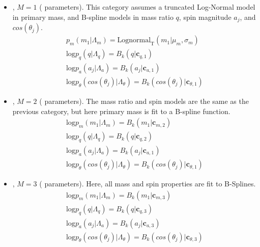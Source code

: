 \begin{itemize}
    \item \first{}, $M=1$ ( parameters). This category assumes a truncated Log-Normal model in primary mass, and B-spline models in mass ratio $q$, spin magnitude $a_j$, and $cos(\theta_{j})$. 
    \begin{eqnarray} \label{eq:lowmass}
        p_{m}(m_1| \Lambda_{m}) = \text{Lognormal}_\text{T}(m_1 | \mu_{m}, \sigma_{m}) \\
        \text{log} p_{q}(q| \Lambda_{q}) = B_k(q | \mathbf{c}_{q,1}) \\
        \text{log} p_{a}(a_j| \Lambda_{a}) = B_k(a_j | \mathbf{c}_{a,1}) \\
        \text{log} p_{\theta}(cos(\theta_j)| \Lambda_{\theta}) = B_k( cos(\theta_j) | \mathbf{c}_{\theta,1})
    \end{eqnarray}

    \item \contA{}, $M=2$ ( parameters). The mass ratio and spin models are the same as the previous category, but here primary mass is fit to a B-spline function. 
    \begin{eqnarray} \label{eq:contmass}
        \text{log} p_{m}(m_1| \Lambda_{m}) = B_k(m_1 | \mathbf{c}_{m, 2}) \\
        \text{log} p_{q}(q| \Lambda_{q}) = B_k(q | \mathbf{c}_{q,2}) \\
        \text{log} p_{a}(a_j| \Lambda_{a}) = B_k(a_j | \mathbf{c}_{a,1}) \\
        \text{log} p_{\theta}(cos(\theta_j)| \Lambda_{\theta}) = B_k( cos(\theta_j) | \mathbf{c}_{\theta,1})
    \end{eqnarray}
    
    \item \contB{}, $M=3$ ( parameters). Here, all mass and spin properties are fit to B-Splines.
    \begin{eqnarray} \label{eq:contmass}
        \text{log} p_{m}(m_1| \Lambda_{m}) = B_k(m_1 | \mathbf{c}_{m, 3}) \\
        \text{log} p_{q}(q| \Lambda_{q}) = B_k(q | \mathbf{c}_{q,3}) \\
        \text{log} p_{a}(a_j| \Lambda_{a}) = B_k(a_j | \mathbf{c}_{a,3}) \\
        \text{log} p_{\theta}(cos(\theta_j)| \Lambda_{\theta}) = B_k( cos(\theta_j) | \mathbf{c}_{\theta,3})
    \end{eqnarray}
\end{itemize}